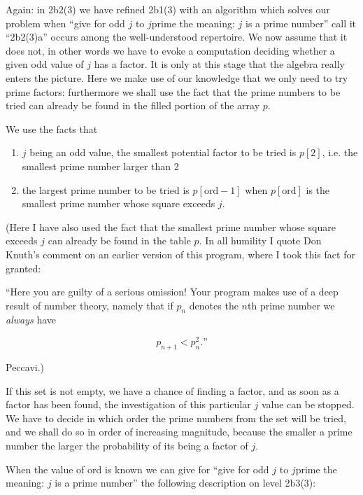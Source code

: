 Again: in 2b2(3) we have refined 2b1(3) with an algorithm which solves our problem when ``give for odd $j$ to $j$prime the meaning: $j$ is a prime number'' \textemdash{}  call it ``2b2(3)a'' \textemdash{}  occurs among the well-understood repertoire. We now assume that it does not, in other words we have to evoke a computation deciding whether a given odd value of $j$ has a factor. It is only at this stage that the algebra really enters the picture. Here we make use of our knowledge that we only need to try prime factors: furthermore we shall use the fact that the prime numbers to be tried can already be found in the filled portion of the array $p$.

We use the facts that

\begin{enumerate}[wide, nosep, label=(\arabic*)]
	\item $j$ being an odd value, the smallest potential factor to be tried is $p[2]$, i.e. the smallest prime number larger than 2

	\item the largest prime number to be tried is $p[\text{ord} - 1]$ when $p[\text{ord}]$ is the smallest prime number whose square exceeds $j$.
\end{enumerate}

(Here I have also used the fact that the smallest prime number whose square exceeds $j$ can already be found in the table $p$. In all humility I quote Don Knuth's comment on an earlier version of this program, where I took this fact for granted:

\begin{addmargin}[\parindent]{0em}
``Here you are guilty of a serious omission! Your program makes use of a deep result of number theory, namely that if $p_n$ denotes the $n$th prime number we \textit{always} have
\end{addmargin}
$$
p_{n+1}<p_n^2.\text{''}
$$

\noindent
Peccavi.)

If this set is not empty, we have a chance of finding a factor, and as soon as a factor has been found, the investigation of this particular $j$ value can be stopped. We have to decide in which order the prime numbers from the set will be tried, and we shall do so in order of increasing magnitude, because the smaller a prime number the larger the probability of its being a factor of $j$.

When the value of ord is known we can give for ``give for odd $j$ to $j$prime the meaning: $j$ is a prime number'' the following description on level 2b3(3):

